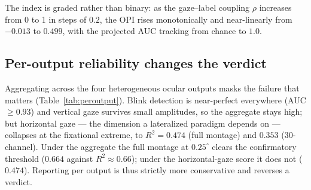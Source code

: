 \documentclass[conference]{IEEEtran}
\begin{document}
The index is graded rather than binary: as the gaze--label coupling $\rho$ increases from 0 to 1
in steps of $0.2$, the OPI rises monotonically and near-linearly from $-0.013$ to $0.499$, with
the projected AUC tracking from chance to $1.0$.

\subsection{Per-output reliability changes the verdict}

Aggregating across the four heterogeneous ocular outputs masks the failure that matters
(Table~\ref{tab:peroutput}). Blink detection is near-perfect everywhere (AUC $\ge0.93$) and
vertical gaze survives small amplitudes, so the aggregate stays high; but horizontal gaze --- the
dimension a lateralized paradigm depends on --- collapses at the fixational extreme, to
$R^2=0.474$ (full montage) and $0.353$ (30-channel). Under the aggregate the full montage at
$0.25^\circ$ clears the confirmatory threshold ($0.664$ against $R^2\approx0.66$); under the
horizontal-gaze score it does not ($0.474$). Reporting per output is thus strictly more conservative and reverses a verdict.
\end{document}
